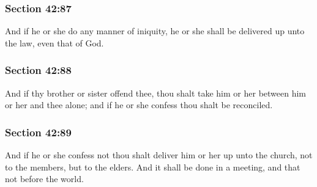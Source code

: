 	\subsubsection{Section 42:87} %
		\label{DC42-87}

		And if he or she do any manner of iniquity, he or she shall be delivered up unto the law, even that of God.


	\subsubsection{Section 42:88} %
		\label{DC42-88}

		And if thy brother or sister offend thee, thou shalt take him or her between him or her and thee alone; and if he or she confess thou shalt be reconciled.


	\subsubsection{Section 42:89} %
		\label{DC42-89}

		And if he or she confess not thou shalt deliver him or her up unto the church, not to the members, but to the elders.  And it shall be done in a meeting, and that not before the world.


